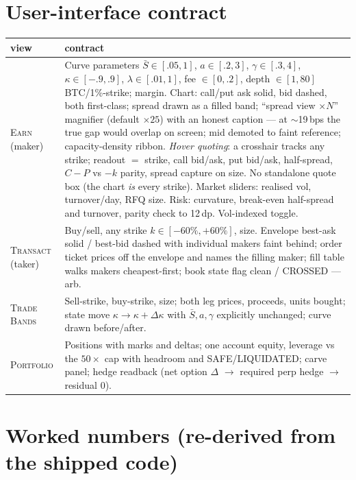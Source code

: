 \documentclass[11pt]{article}
\newcommand{\Sbar}{\bar{S}}
\begin{document}
\section{User-interface contract}\label{sec:ui}

\begin{center}\small
\begin{tabular}{p{2.4cm}p{12.6cm}}
\toprule
view & contract \\
\midrule
\textsc{Earn} (maker) & Curve parameters $\Sbar\in[.05,1]$, $a\in[.2,3]$, $\gamma\in[.3,4]$,
$\kappa\in[-.9,.9]$, $\lambda\in[.01,1]$, fee $\in[0,.2]$, depth $\in[1,80]$ BTC/1\%-strike;
margin. Chart: call/put ask solid, bid dashed, both first-class; spread drawn as a filled band;
``spread view $\times N$'' magnifier (default $\times 25$) with an honest caption --- at
$\sim$19\,bps the true gap would overlap on screen; mid demoted to faint reference;
capacity-density ribbon. \emph{Hover quoting}: a crosshair tracks any strike; readout $=$
strike, call bid/ask, put bid/ask, half-spread, $C-P$ vs $-k$ parity, spread capture on size.
No standalone quote box (the chart \emph{is} every strike). Market sliders: realised vol,
turnover/day, RFQ size. Risk: curvature, break-even half-spread and turnover, parity check to
12\,dp. Vol-indexed toggle. \\
\textsc{Transact} (taker) & Buy/sell, any strike $k\in[-60\%,+60\%]$, size. Envelope best-ask
solid / best-bid dashed with individual makers faint behind; order ticket prices off the
envelope and names the filling maker; fill table walks makers cheapest-first; book state flag
\textsf{clean} / \textsf{CROSSED --- arb}. \\
\textsc{Trade Bands} & Sell-strike, buy-strike, size; both leg prices, proceeds, units bought;
state move $\kappa\to\kappa+\Delta\kappa$ with $\Sbar,a,\gamma$ explicitly unchanged; curve
drawn before/after. \\
\textsc{Portfolio} & Positions with marks and deltas; one account equity, leverage vs the
$50\times$ cap with headroom and \textsf{SAFE/LIQUIDATED}; carve panel; hedge readback (net
option $\Delta$ $\to$ required perp hedge $\to$ residual $0$). \\
\bottomrule
\end{tabular}
\end{center}

\section{Worked numbers (re-derived from the shipped code)}\label{sec:numbers}
\end{document}
